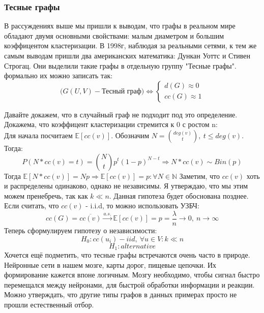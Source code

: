 \subsubsection{Тесные графы}
    В рассуждениях выше мы пришли к выводам, что графы в реальном мире обладают
двумя основными свойствами: малым диаметром и большим коэффицентом кластеризации.
В 1998г, наблюдая за реальными сетями, к тем же самым выводам пришли два американских 
математика: Дункан Уоттс и Стивен Строгац. Они выделили такие графы в отдельную группу
"Тесные графы". формально их можно записать так:
\begin{equation*}
    \bigg(G(U, V) - \text{Тесный граф}\bigg) \Leftrightarrow
    \begin{cases}
        d(G) \approx 0 \\
        cc(G) \approx 1
    \end{cases}
\end{equation*}

Давайте докажем, что в случайный граф не подходит под это определение.
Докажема, что коэффицент кластеризации стремится к 0 с ростом n: \\
Для начала посчитаем $\mathbb{E}[cc(v)]$. Обозначим $N = \binom{deg(v)}{t}, \ t \leq deg(v)$.
Тогда:
\begin{equation*}
    P(N * cc(v) = t) = \binom{N}{t}p^t(1 - p)^{N - t} \Rightarrow N * cc(v) \sim Bin(p) 
\end{equation*}
Тогда $\mathbb{E}[N * cc(v)] = Np \Rightarrow \mathbb{E}[cc(v)] = p : \forall N \in \mathbb{N}$
Заметим, что $cc(v)$  хоть и распределены одинаково, однако не независимы. Я утверждаю, что мы
этим можем пренебречь, так как $k \ll n$. Данная гипотеза будет обоснована позднее. \\
Если считать, что $cc(v)$ - i.i.d, то можно использовать УЗБЧ:
\begin{equation*}
    cc(G) = \overline{cc(v)} \overset{a.s.}{\rightarrow} 
    \mathbb{E}[cc(v)] = p = \frac{\lambda}{n} \rightarrow 0, \ n \rightarrow \infty
\end{equation*}
Теперь сформулируем гипотезу о независимости:
\begin{equation*}
    H_0: cc(u_i) - iid, \ \forall u \in V : k \ll n
\end{equation*}
\begin{equation*}
    H_1: alternative 
\end{equation*}
Хочется ещё подметить, что тесные графы встречаются очень часто в природе.
Нейронные сети в нашем мозге, карты дорог, пищевые цепочки. Их формирование кажется
впоне логичным. Мозгу необходимо, чтобы сигнал быстро перемещался между нейронами,
для быстрой обработки информации и реакции. Можно утверждать, что другие типы графов
в данных примерах просто не прошли естественный отбор.















